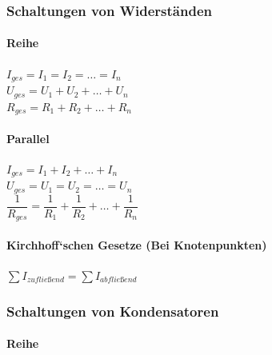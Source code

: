 \documentclass[a4paper]{article}
\begin{document}
\subsubsection{Schaltungen von Widerständen}

\paragraph{Reihe}

\begin{center}
	\Large
		$I_{ges} = I_1 = I_2 = … = I_n$\\[0,5cm]
		$U_{ges} = U_1 + U_2 + … + U_n$\\[0,5cm]
		$R_{ges} = R_1 + R_2 + … + R_n$\\[1cm]
	\normalsize
\end{center}


\paragraph{Parallel}

\begin{center}
	\Large
		$I_{ges} = I_1 + I_2 + … + I_n$\\[0,5cm]
		$U_{ges} = U_1 = U_2 = … = U_n$\\[0,5cm]
		$\dfrac{1}{R_{ges}} = \dfrac{1}{R_1} + \dfrac{1}{R_2} + … + \dfrac{1}{R_n}$\\[1cm]
	\normalsize
\end{center}


\paragraph{Kirchhoff‘schen Gesetze (Bei Knotenpunkten)}

\begin{center}
    \Large 
        $\sum{I_{zufließend}} = \sum{I_{abfließend}}$\\[1cm]
    \normalsize
\end{center}



\subsubsection{Schaltungen von Kondensatoren}

\paragraph{Reihe}
\end{document}
